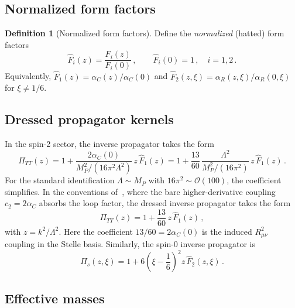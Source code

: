 \documentclass[aps,prd,twocolumn,superscriptaddress,nofootinbib,floatfix]{revtex4-2}
\theoremstyle{definition}
\newtheorem{definition}[theorem]{Definition}
\theoremstyle{remark}
\begin{document}
\subsection{Normalized form factors}

\begin{definition}[Normalized form factors]
\label{def:Fhat}
Define the \emph{normalized} (hatted) form factors
\begin{equation}
  \hat{F}_i(z) = \frac{F_i(z)}{F_i(0)}\,,\qquad
  \hat{F}_i(0) = 1\,,\quad i = 1,2\,.
  \label{eq:Fhat-def}
\end{equation}
Equivalently, $\hat{F}_1(z) = \alpha_C(z)/\alpha_C(0)$ and
$\hat{F}_2(z,\xi) = \alpha_R(z,\xi)/\alpha_R(0,\xi)$ for $\xi \neq 1/6$.
\end{definition}

\subsection{Dressed propagator kernels}

In the spin-2 sector, the inverse propagator takes the form
\begin{equation}
  \Pi_{TT}(z) = 1 + \frac{2\alpha_C(0)}{M_P^2/(16\pi^2\Lambda^2)}\,
    z\,\hat{F}_1(z)
  = 1 + \frac{13}{60}\,\frac{\Lambda^2}{M_P^2/(16\pi^2)}\,z\,\hat{F}_1(z)\,.
  \label{eq:PiTT-full}
\end{equation}
For the standard identification $\Lambda \sim M_P$ with
$16\pi^2 \sim \mathcal{O}(100)$, the coefficient simplifies.
In the conventions of~\cite{Stelle:1976gc}, where the bare
higher-derivative coupling $c_2 = 2\alpha_C$ absorbs the loop factor, the
dressed inverse propagator takes the form
\begin{equation}
  \Pi_{TT}(z) = 1 + \frac{13}{60}\,z\,\hat{F}_1(z)\,,
  \label{eq:PiTT}
\end{equation}
with $z = k^2/\Lambda^2$. Here the coefficient $13/60 = 2\alpha_C(0)$ is
the induced $R_{\mu\nu}^2$ coupling in the Stelle basis.
Similarly, the spin-0 inverse propagator is
\begin{equation}
  \Pi_s(z,\xi) = 1 + 6\!\left(\xi - \frac{1}{6}\right)^{\!2}
    z\,\hat{F}_2(z,\xi)\,.
  \label{eq:Pis}
\end{equation}

\subsection{Effective masses}
\end{document}
